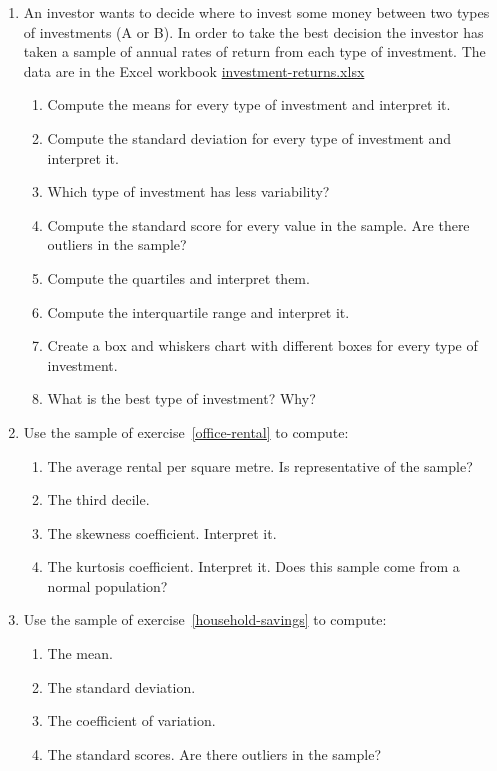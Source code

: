 \begin{enumerate}[leftmargin=*,resume]
\item An investor wants to decide where to invest some money between two types of investments (A or B). In order to take the best decision the investor has taken a sample of annual rates of return from each type of investment. 
The data are in the Excel workbook \href{http://aprendeconalf.es/office/excel/exercises/descriptive-statistics/investment-returns.xlsx}{\textsf{investment-returns.xlsx}}
\begin{enumerate}
\item Compute the means for every type of investment and interpret it. 
\item Compute the standard deviation for every type of investment and interpret it.
\item Which type of investment has less variability?
\item Compute the standard score for every value in the sample.
Are there outliers in the sample?
\item Compute the quartiles and interpret them. 
\item Compute the interquartile range and interpret it. 
\item Create a box and whiskers chart with different boxes for every type of investment. 
\item What is the best type of investment? Why?
\end{enumerate}

\item Use the sample of exercise~\ref{office-rental} to compute:
\begin{enumerate}
\item The average rental per square metre. 
Is representative of the sample?
\item The third decile.
\item The skewness coefficient. Interpret it. 
\item The kurtosis coefficient. 
Interpret it.
Does this sample come from a normal population?
\end{enumerate}

\item Use the sample of exercise~\ref{household-savings} to compute:
\begin{enumerate}
\item The mean.
\item The standard deviation.
\item The coefficient of variation.
\item The standard scores.
Are there outliers in the sample?
\end{enumerate}


\end{enumerate}
